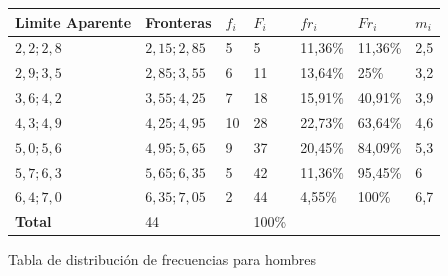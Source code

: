 \documentclass{templateNote}
\begin{document}
\begin{figure}[H]
    \centering
    \begin{tabularx}{\textwidth}{|L|L|L|L|L|L|L|}
        \hline
        \textbf{Limite Aparente} & \textbf{Fronteras}& \textbf{$f_i$} & \textbf{$F_i$} & \textbf{$fr_i$} & \textbf{$Fr_i$} & \textbf{$m_i$} \\
        \hline
        $2,2;2,8$ & $2,15;2,85$ & 5 & 5 & 11,36\% & 11,36\% & 2,5 \\
        \hline
        $2,9;3,5$ & $2,85;3,55$ & 6 & 11 & 13,64\% & 25\% & 3,2 \\
        \hline
        $3,6;4,2$ & $3,55;4,25$ & 7 & 18 & 15,91\% & 40,91\% & 3,9 \\
        \hline
        $4,3;4,9$ & $4,25;4,95$ & 10 & 28 & 22,73\% & 63,64\% & 4,6 \\
        \hline
        $5,0;5,6$ & $4,95;5,65$ & 9 & 37 & 20,45\% & 84,09\% & 5,3 \\
        \hline
        $5,7;6,3$ & $5,65;6,35$ & 5 & 42 & 11,36\% & 95,45\% & 6 \\
        \hline
        $6,4;7,0$ & $6,35;7,05$ & 2 & 44 & 4,55\% & 100\% & 6,7 \\
        \hline
        \textbf{Total} & 44 &  & 100\% &  \\
        \hline
    \end{tabularx}
    \caption{Tabla de distribución de frecuencias para hombres}
\end{figure}
\end{document}
